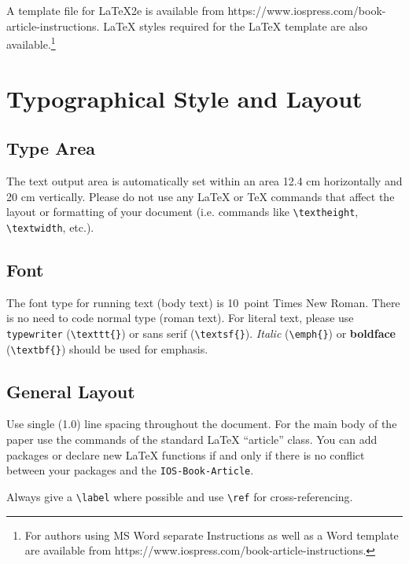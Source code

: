 \documentclass{IOS-Book-Article}
\begin{document}
A template file for \LaTeX2e is available from
https://www.iospress.com/book-article-instructions. \LaTeX{} styles required for the \LaTeX{} template are also
available.\footnote{For authors using MS Word separate Instructions as well
as a Word template are available from https://www.iospress.com/book-article-instructions.}

\section{Typographical Style and Layout}

\subsection{Type Area}
The text output area is automatically set within an area 12.4 cm
horizontally and 20 cm vertically. Please do not use any
\LaTeX{} or \TeX{} commands that affect the layout or formatting of
your document (i.e. commands like \verb|\textheight|,
\verb|\textwidth|, etc.).



\subsection{Font}

The font type for running text (body text) is 10~point Times New Roman.
There is no need to code normal type (roman text). For literal text, please use
\texttt{type\-writer} (\verb|\texttt{}|)
or \textsf{sans serif} (\verb|\textsf{}|). \emph{Italic} (\verb|\emph{}|)
or \textbf{boldface} (\verb|\textbf{}|) should be used for emphasis.

\subsection{General Layout}
Use single (1.0) line spacing throughout the document. For the main
body of the paper use the commands of the standard \LaTeX{}
``article'' class. You can add packages or declare new \LaTeX{}
functions if and only if there is no conflict between your packages
and the \texttt{IOS-Book-Article}.

Always give a \verb|\label| where possible and use \verb|\ref| for cross-referencing.
\end{document}
